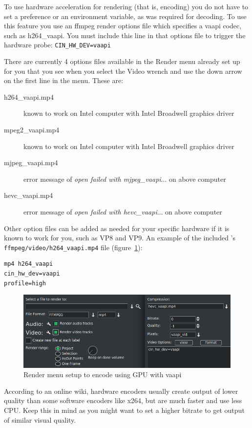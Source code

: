 To use hardware acceleration for rendering (that is, encoding) you do not have to set a preference or an environment variable, as was required for decoding.  To use this feature you use an ffmpeg render options file which specifies a vaapi codec, such as h264\_vaapi.  You must include this line in that options file to trigger the hardware probe: \qquad	\texttt{CIN\_HW\_DEV=vaapi}

There are currently 4 options files available in the Render menu already set up for you that you see when you select the Video wrench and use the down arrow on the first line in the menu.  These are:

\begin{description}
	\item[h264\_vaapi.mp4] known to work on Intel computer with Intel Broadwell graphics driver
	\item[mpeg2\_vaapi.mp4] known to work on Intel computer with Intel Broadwell graphics driver
	\item[mjpeg\_vaapi.mp4] error message of \textit{open failed with mjpeg\_vaapi$\dots$} on above computer
	\item[hevc\_vaapi.mp4] error message of \textit{open failed with hevc\_vaapi$\dots$} on above computer
\end{description}
Other option files can be added as needed for your specific hardware if it is known to work for you, such as VP8 and VP9.  An example of the included \CGG{}’s \texttt{ffmpeg/video/h264\_vaapi.mp4} file (figure~\ref{fig:render-vaapi}):


\begin{lstlisting}[numbers=none]
mp4 h264_vaapi
cin_hw_dev=vaapi
profile=high
\end{lstlisting}

\begin{figure}[htpb]
	\centering
	\includegraphics[width=0.7\linewidth]{images/render-vaapi.png}
	\caption{Render menu setup to encode using GPU with vaapi}
	\label{fig:render-vaapi}
\end{figure}

According to an online wiki, hardware encoders usually create output of lower quality than some software encoders like x264, but are much faster and use less CPU. Keep this in mind as you might want to set a higher bitrate to get output of similar visual quality.

